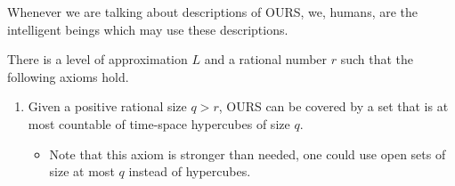 \documentclass[a4paper
,draft
]{article}
\newcommand{\svn}[2][]{\todo[author=Virgil,color=red!25!white,#1]{#2}}
\begin{document}
Whenever we are talking about descriptions of OURS, we, humans, are the intelligent beings which may use these descriptions.

There is a level of approximation $L$ and a rational number $r$ \svn{Do I need $r > \eta$?}such that the following axioms hold.

\begin{enumerate}
\item \label{countablecovering} Given a positive rational size $q>r$, OURS can be covered by a set that is at most countable of time-space hypercubes of size $q$.
  \begin{itemize}
    \item Note that this axiom is stronger than needed, one could use open sets of size at most $q$ instead of hypercubes.
  \end{itemize}


\end{enumerate}
\end{document}
